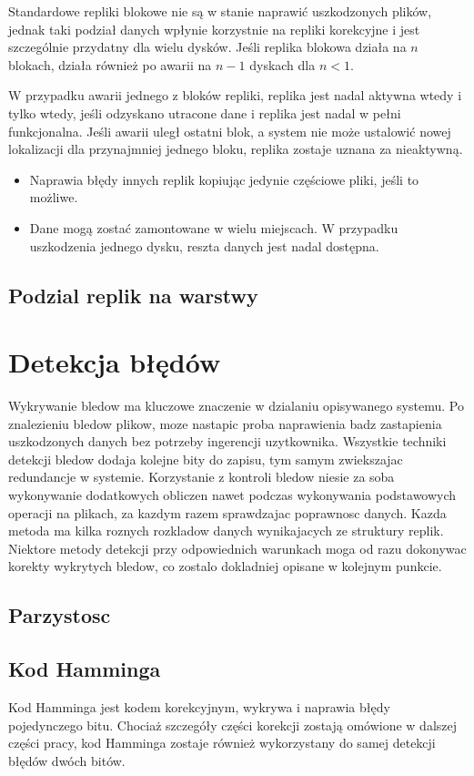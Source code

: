 Standardowe repliki blokowe nie są w stanie naprawić uszkodzonych plików, jednak taki podział danych wpłynie korzystnie na repliki korekcyjne i jest szczególnie przydatny dla wielu dysków. Jeśli replika blokowa działa na $n$ blokach, działa również po awarii na $n-1$ dyskach dla $n < 1$.

W przypadku awarii jednego z bloków repliki, replika jest nadal aktywna wtedy i tylko wtedy, jeśli odzyskano utracone dane i replika jest nadal w pełni funkcjonalna. Jeśli awarii uległ ostatni blok, a system nie może ustalowić nowej lokalizacji dla przynajmniej jednego bloku, replika zostaje uznana za nieaktywną.
\begin{itemize}
    \item Naprawia błędy innych replik kopiując jedynie częściowe pliki, jeśli to możliwe.
    \item Dane mogą zostać zamontowane w wielu miejscach. W przypadku uszkodzenia jednego dysku, reszta danych jest nadal dostępna.
\end{itemize}

\subsection{Podzial replik na warstwy}

\section {Detekcja błędów}
    Wykrywanie bledow ma kluczowe znaczenie w dzialaniu opisywanego systemu. Po znalezieniu bledow plikow, moze nastapic proba naprawienia badz zastapienia uszkodzonych danych bez potrzeby ingerencji uzytkownika. Wszystkie techniki detekcji bledow dodaja kolejne bity do zapisu, tym samym zwiekszajac redundancje w systemie. Korzystanie z kontroli bledow niesie za soba wykonywanie dodatkowych obliczen nawet podczas wykonywania podstawowych operacji na plikach, za kazdym razem sprawdzajac poprawnosc danych. Kazda metoda ma kilka roznych rozkladow danych wynikajacych ze struktury replik. Niektore metody detekcji przy odpowiednich warunkach moga od razu dokonywac korekty wykrytych bledow, co zostalo dokladniej opisane w kolejnym punkcie.
\subsection{Parzystosc}
\subsection{Kod Hamminga}
Kod Hamminga jest kodem korekcyjnym, wykrywa i naprawia błędy pojedynczego bitu. Chociaż szczegóły części korekcji zostają omówione w dalszej części pracy, kod Hamminga zostaje również wykorzystany do samej detekcji błędów dwóch bitów.

